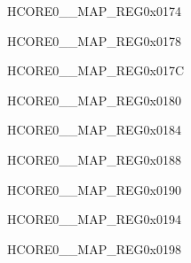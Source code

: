 \begin{register}{H}{CORE0\_\_MAP\_REG}{0x0174}\label{regdesc:CORE0USBOTGINTMAPREG}
\end{register}\vspace{-3em}


\begin{register}{H}{CORE0\_\_MAP\_REG}{0x0178}\label{regdesc:CORE0USBOTGENDPMULTIPROCINTMAPREG}
\end{register}\vspace{-3em}


\begin{register}{H}{CORE0\_\_MAP\_REG}{0x017C}\label{regdesc:CORE0JPEGINTMAPREG}
\end{register}\vspace{-3em}


\begin{register}{H}{CORE0\_\_MAP\_REG}{0x0180}\label{regdesc:CORE0PPAINTMAPREG}
\end{register}\vspace{-3em}


\begin{register}{H}{CORE0\_\_MAP\_REG}{0x0184}\label{regdesc:CORE0CORE0TRACEINTMAPREG}
\end{register}\vspace{-3em}


\begin{register}{H}{CORE0\_\_MAP\_REG}{0x0188}\label{regdesc:CORE0CORE1TRACEINTMAPREG}
\end{register}\vspace{-3em}



\begin{register}{H}{CORE0\_\_MAP\_REG}{0x0190}\label{regdesc:CORE0ISPINTMAPREG}
\end{register}\vspace{-3em}


\begin{register}{H}{CORE0\_\_MAP\_REG}{0x0194}\label{regdesc:CORE0I3CMSTINTMAPREG}
\end{register}\vspace{-3em}


\begin{register}{H}{CORE0\_\_MAP\_REG}{0x0198}\label{regdesc:CORE0I3CSLVINTMAPREG}
\end{register}\vspace{-3em}


